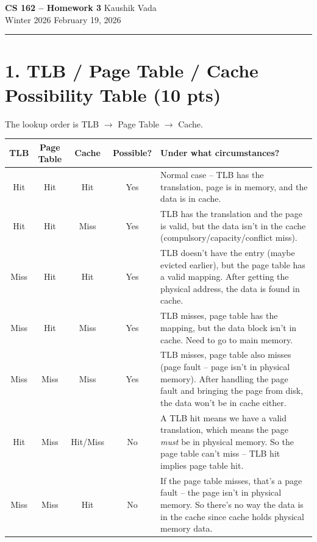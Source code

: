 \documentclass[11pt]{article}
\begin{document}
\noindent
\textbf{CS 162 -- Homework 3} \hfill Kaushik Vada \\
Winter 2026 \hfill February 19, 2026

\bigskip
\hrule
\bigskip

\section*{1. TLB / Page Table / Cache Possibility Table (10 pts)}

The lookup order is TLB $\to$ Page Table $\to$ Cache.

\renewcommand{\arraystretch}{1.35}
\begin{center}
\begin{tabular}{|c|c|c|c|p{7cm}|}
\hline
\textbf{TLB} & \textbf{Page Table} & \textbf{Cache} & \textbf{Possible?} & \textbf{Under what circumstances?} \\
\hline
Hit & Hit & Hit & Yes & Normal case -- TLB has the translation, page is in memory, and the data is in cache. \\
\hline
Hit & Hit & Miss & Yes & TLB has the translation and the page is valid, but the data isn't in the cache (compulsory/capacity/conflict miss). \\
\hline
Miss & Hit & Hit & Yes & TLB doesn't have the entry (maybe evicted earlier), but the page table has a valid mapping. After getting the physical address, the data is found in cache. \\
\hline
Miss & Hit & Miss & Yes & TLB misses, page table has the mapping, but the data block isn't in cache. Need to go to main memory. \\
\hline
Miss & Miss & Miss & Yes & TLB misses, page table also misses (page fault -- page isn't in physical memory). After handling the page fault and bringing the page from disk, the data won't be in cache either. \\
\hline
Hit & Miss & Hit/Miss & No & A TLB hit means we have a valid translation, which means the page \textit{must} be in physical memory. So the page table can't miss -- TLB hit implies page table hit. \\
\hline
Miss & Miss & Hit & No & If the page table misses, that's a page fault -- the page isn't in physical memory. So there's no way the data is in the cache since cache holds physical memory data. \\
\hline
\end{tabular}
\end{center}
\end{document}
